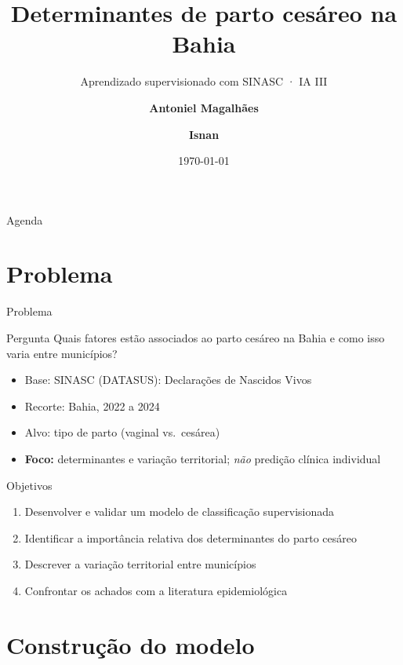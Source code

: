 \documentclass[aspectratio=169,xcolor=table]{beamer}
\author[Antoniel \& Isnan]{\textbf{Antoniel Magalhães} \and \textbf{Isnan}}
\title{Determinantes de parto cesáreo na Bahia}
\subtitle{Aprendizado supervisionado com SINASC · IA III}
\institute{Universidade Federal da Bahia}
\date{\today}
\begin{document}
\begin{frame}
    \titlepage
\end{frame}

\begin{frame}{Agenda}
    \tableofcontents
\end{frame}

\section{Problema}

\begin{frame}{Problema}
    \begin{block}{Pergunta}
        Quais fatores estão associados ao parto cesáreo na Bahia e como isso varia entre municípios?
    \end{block}

    \begin{itemize}
        \item Base: SINASC (DATASUS): Declarações de Nascidos Vivos
        \item Recorte: Bahia, 2022 a 2024
        \item Alvo: tipo de parto (vaginal vs.\ cesárea)
        \item \textbf{Foco:} determinantes e variação territorial; \emph{não} predição clínica individual
    \end{itemize}
\end{frame}

\begin{frame}{Objetivos}
    \begin{enumerate}
        \item Desenvolver e validar um modelo de classificação supervisionada
        \item Identificar a importância relativa dos determinantes do parto cesáreo
        \item Descrever a variação territorial entre municípios
        \item Confrontar os achados com a literatura epidemiológica
    \end{enumerate}
\end{frame}

\section{Construção do modelo}
\end{document}
